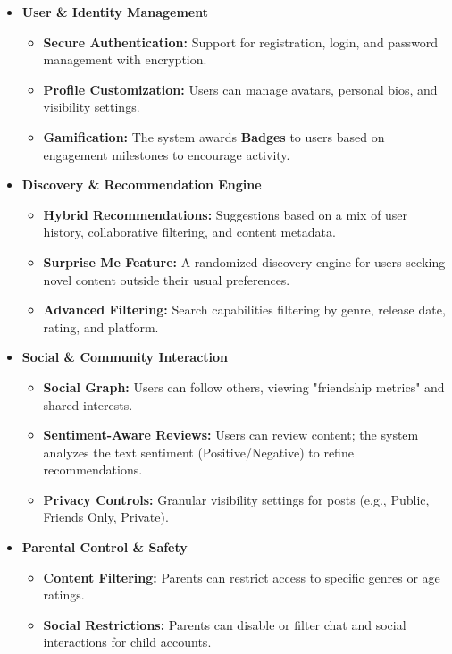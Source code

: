 \begin{itemize}
    \item \textbf{User \& Identity Management}
    \begin{itemize}
        \item \textbf{Secure Authentication:} Support for registration, login, and password management with encryption.
        \item \textbf{Profile Customization:} Users can manage avatars, personal bios, and visibility settings.
        \item \textbf{Gamification:} The system awards \textbf{Badges} to users based on engagement milestones to encourage activity.
    \end{itemize}

    \item \textbf{Discovery \& Recommendation Engine}
    \begin{itemize}
        \item \textbf{Hybrid Recommendations:} Suggestions based on a mix of user history, collaborative filtering, and content metadata.
        \item \textbf{Surprise Me Feature:} A randomized discovery engine for users seeking novel content outside their usual preferences.
        \item \textbf{Advanced Filtering:} Search capabilities filtering by genre, release date, rating, and platform.
    \end{itemize}

    \item \textbf{Social \& Community Interaction}
    \begin{itemize}
        \item \textbf{Social Graph:} Users can follow others, viewing "friendship metrics" and shared interests.
        \item \textbf{Sentiment-Aware Reviews:} Users can review content; the system analyzes the text sentiment (Positive/Negative) to refine recommendations.
        \item \textbf{Privacy Controls:} Granular visibility settings for posts (e.g., Public, Friends Only, Private).
    \end{itemize}

    \item \textbf{Parental Control \& Safety}
    \begin{itemize}
        \item \textbf{Content Filtering:} Parents can restrict access to specific genres or age ratings.
        \item \textbf{Social Restrictions:} Parents can disable or filter chat and social interactions for child accounts.
    \end{itemize}
\end{itemize}

